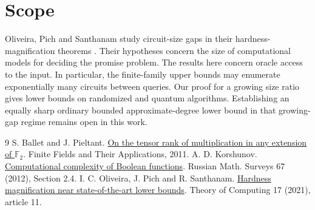 \documentclass[11pt]{article}
\begin{document}





\section{Scope}
Oliveira, Pich and Santhanam study circuit-size gaps in their hardness-magnification theorems \cite{ops}. Their hypotheses concern the size of computational models for deciding the promise problem. The results here concern oracle access to the input. In particular, the finite-family upper bounds may enumerate exponentially many circuits between queries. Our proof for a growing size ratio gives lower bounds on randomized and quantum algorithms. Establishing an equally sharp ordinary bounded approximate-degree lower bound in that growing-gap regime remains open in this work.
\begin{thebibliography}{9}
 S. Ballet and J. Pieltant. \href{https://arxiv.org/abs/1003.1864}{On the tensor rank of multiplication in any extension of $\mathbb F_2$}. Finite Fields and Their Applications, 2011.
 A. D. Korshunov. \href{https://www.mathnet.ru/eng/rm9459}{Computational complexity of Boolean functions}. Russian Math. Surveys 67 (2012), Section 2.4.
 I. C. Oliveira, J. Pich and R. Santhanam. \href{https://theoryofcomputing.org/articles/v017a011/}{Hardness magnification near state-of-the-art lower bounds}. Theory of Computing 17 (2021), article 11.
\end{thebibliography}
\end{document}
